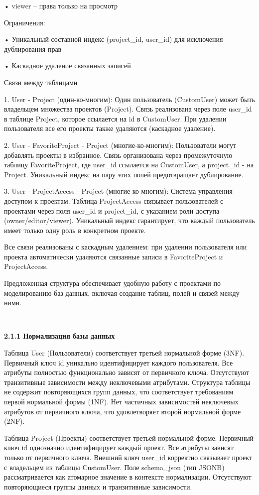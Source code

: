 • viewer – права только на просмотр

Ограничения:

• Уникальный составной индекс (project\_id, user\_id) для исключения дублирования прав

• Каскадное удаление связанных записей

Связи между таблицами

1. User - Project (один-ко-многим):
Один пользователь (CustomUser) может быть владельцем множества проектов (Project). Связь реализована через поле user\_id в таблице Project, которое ссылается на id в CustomUser. При удалении пользователя все его проекты также удаляются (каскадное удаление).

2. User - FavoriteProject - Project (многие-ко-многим):
Пользователи могут добавлять проекты в избранное. Связь организована через промежуточную таблицу FavoriteProject, где user\_id ссылается на CustomUser, а project\_id - на Project. Уникальный индекс на пару этих полей предотвращает дублирование.

3. User - ProjectAccess - Project (многие-ко-многим):
Система управления доступом к проектам. Таблица ProjectAccess связывает пользователей с проектами через поля user\_id и project\_id, с указанием роли доступа (owner/editor/viewer). Уникальный индекс гарантирует, что каждый пользователь имеет только одну роль в конкретном проекте.

Все связи реализованы с каскадным удалением: при удалении пользователя или проекта автоматически удаляются связанные записи в FavoriteProject и ProjectAccess.


Предложенная структура обеспечивает удобную работу с проектами по моделированию баз данных, включая создание таблиц, полей и связей между ними. 

\

\textbf{2.1.1 Нормализация базы данных}

Таблица User (Пользователи) соответствует третьей нормальной форме (3NF). Первичный ключ id уникально идентифицирует каждого пользователя.
Все атрибуты полностью функционально зависят от первичного ключа. 
Отсутствуют транзитивные зависимости между неключевыми атрибутами. Структура таблицы не содержит повторяющихся групп данных, что соответствует требованиям первой нормальной формы (1NF). Нет частичных зависимостей неключевых атрибутов от первичного ключа, что удовлетворяет второй нормальной форме (2NF).

Таблица Project (Проекты) соответствует третьей нормальной форме. Первичный ключ id однозначно идентифицирует каждый проект. Все атрибуты зависят только от первичного ключа. 
Внешний ключ user\_id корректно связывает проект с владельцем из таблицы CustomUser. Поле schema\_json (тип JSONB) рассматривается как атомарное значение в контексте нормализации. Отсутствуют повторяющиеся группы данных и транзитивные зависимости.

